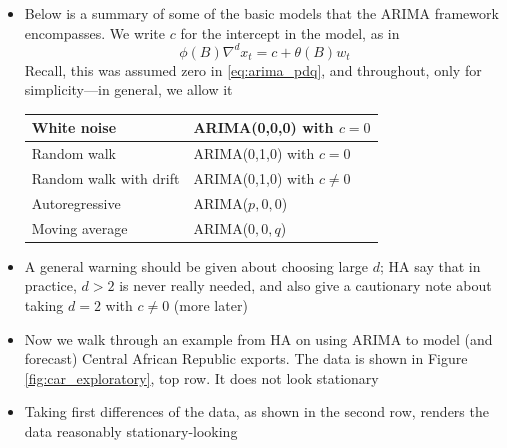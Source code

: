 \documentclass{article}
\begin{document}
\begin{itemize}
\item Below is a summary of some of the basic models that the ARIMA framework
  encompasses. We write $c$ for the intercept in the model, as in 
  \begin{equation}
  \label{eq:arima_pdq_c}
  \phi(B) \nabla^d x_t = c + \theta(B) w_t
  \end{equation}
  Recall, this was assumed zero in \eqref{eq:arima_pdq}, and throughout, only
  for simplicity---in general, we allow it 

  \begin{center} \smallskip
  \begin{tabular}{|l|l|}
  \hline
  White noise & ARIMA(0,0,0) with $c=0$ \\
  \hline
  Random walk & ARIMA(0,1,0) with $c=0$ \\
  \hline 
  Random walk with drift & ARIMA(0,1,0) with $c \not= 0$ \\
  \hline
  Autoregressive & ARIMA($p,0,0$) \\
  \hline
  Moving average & ARIMA($0,0,q$) \\
  \hline
  \end{tabular} \smallskip
  \end{center}

\item A general warning should be given about choosing large $d$; HA say that in
  practice, $d > 2$ is never really needed, and also give a cautionary note
  about taking $d = 2$ with $c \not= 0$ (more later)

\item Now we walk through an example from HA on using ARIMA to model (and
  forecast) Central African Republic exports. The data is shown in Figure
  \ref{fig:car_exploratory}, top row. It does not look stationary  

\item Taking first differences of the data, as shown in the second row, renders
  the data reasonably stationary-looking 


\end{itemize}
\end{document}
